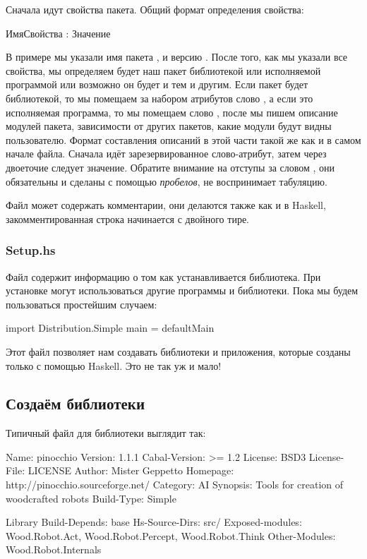 Сначала идут свойства пакета. Общий формат определения свойства:


\begin{code}
ИмяСвойства : Значение
\end{code}

В примере мы указали имя пакета , и версию . После того,
как мы указали все свойства, мы определяем будет наш пакет библиотекой
или исполняемой программой или возможно он будет и тем и другим. Если
пакет будет библиотекой, то мы помещаем за набором атрибутов слово
, а если это исполняемая программа, то мы помещаем слово
, после мы пишем описание модулей пакета, зависимости от
других пакетов, какие модули будут видны пользователю. Формат
составления описаний в этой части такой же как и в самом начале файла.
Сначала идёт зарезервированное слово-атрибут, затем через двоеточие
следует значение. Обратите внимание на отступы за словом ,
они обязательны и сделаны с помощью \emph{пробелов},  не
воспринимает табуляцию.

Файл  может содержать комментарии, они делаются также как и в
Haskell, закомментированная строка начинается с двойного тире.

\subsubsection{Setup.hs}

Файл  содержит информацию о том как устанавливается
библиотека. При установке могут использоваться другие программы и
библиотеки. Пока мы будем пользоваться простейшим случаем:


\begin{code}
import Distribution.Simple
main = defaultMain
\end{code}

Этот файл позволяет нам создавать библиотеки и приложения, которые
созданы только с помощью Haskell. Это не так уж и мало!

\subsection{Создаём библиотеки}

Типичный файл  для библиотеки выглядит так:


\begin{code}
Name:           pinocchio
Version:        1.1.1
Cabal-Version:  >= 1.2
License:        BSD3
License-File:   LICENSE
Author:         Mister Geppetto
Homepage:       http://pinocchio.sourceforge.net/
Category:       AI
Synopsis:       Tools for creation of woodcrafted robots
Build-Type:     Simple


Library
  Build-Depends: base
  Hs-Source-Dirs: src/  
  Exposed-modules:
    Wood.Robot.Act, Wood.Robot.Percept, Wood.Robot.Think
  Other-Modules:
    Wood.Robot.Internals
\end{code}

